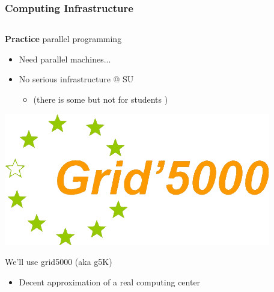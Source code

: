 \documentclass[10pt]{beamer}
\begin{document}
\begin{frame}[label=tme]
  \frametitle{Computing Infrastructure}

  \begin{columns}
    \begin{column}{7cm}

      \begin{block}{\textbf{Practice} parallel programming}
        \begin{itemize}
        \item Need parallel machines...
        \item No serious infrastructure @ SU
          \begin{itemize}
          \item (there is some but not for students 
)
          \end{itemize}
        \end{itemize}
      \end{block}

      \medskip

      \begin{center}
        \includegraphics{grid5000_logo.png}
      \end{center}
      
      \begin{exampleblock}{We'll use grid5000 (aka g5K)}
        \begin{itemize}
        \item Decent approximation of a real computing center
        \end{itemize}
      \end{exampleblock}
      

\end{column}
\end{columns}
\end{frame}
\end{document}
